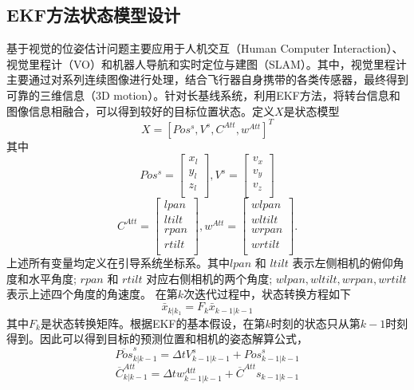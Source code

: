 \subsection{EKF方法状态模型设计}
基于视觉的位姿估计问题主要应用于人机交互（Human Computer Interaction）、视觉里程计（VO）和机器人导航和实时定位与建图（SLAM）。其中，视觉里程计主要通过对系列连续图像进行处理，结合飞行器自身携带的各类传感器，最终得到可靠的三维信息（3D motion）。针对长基线系统，利用EKF方法，将转台信息和图像信息相融合，可以得到较好的目标位置状态。定义$X$是状态模型
\begin{equation}
X=[Pos^s, V^s, C^{Att}, w^{Att}]^T
\end{equation}
其中
$$
Pos^s=\left[\begin{array}{c}
x_l\\
y_l\\
z_l\\
\end{array}\right],
V^s=\left[\begin{array}{c}
v_x\\
v_y\\
v_z\\
\end{array}\right]
$$
$$
C^{Att}=\left[\begin{array}{c}
lpan\\
ltilt\\
rpan\\
rtilt\\
\end{array}\right],
w^{Att}=\left[\begin{array}{c}
wlpan\\
wltilt\\
wrpan\\
wrtilt\\
\end{array}\right].
$$
上述所有变量均定义在引导系统坐标系。其中$lpan$ 和 $ltilt$ 表示左侧相机的俯仰角度和水平角度; $rpan$ 和 $rtilt$ 对应右侧相机的两个角度; $wlpan, wltilt, wrpan, wrtilt$ 表示上述四个角度的角速度。
在第$k$次迭代过程中，状态转换方程如下
\begin{equation}
\bar{x}_{k|k_1}=F_k\bar{x}_{k-1|k-1}
\end{equation}
其中$F_k$是状态转换矩阵。根据EKF的基本假设，在第$k$时刻的状态只从第$k-1$时刻得到。因此可以得到目标的预测位置和相机的姿态解算公式，
\begin{equation}
\overline{Pos}^s_{k|k-1}=\Delta t V^s_{k-1|k-1} + {Pos}^s_{k-1|k-1}
\end{equation}
\begin{equation}
\overline{C}^{Att}_{k|k-1}=\Delta t w^{Att}_{k-1|k-1} + \overline{C}^{Att}s_{k-1|k-1}
\end{equation}
